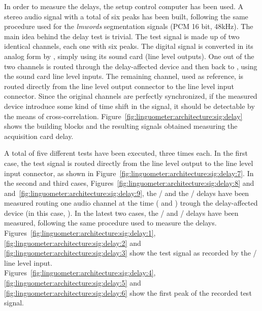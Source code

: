 In order to measure the delays, the setup control computer  has been 
used.
A stereo audio signal with a total of six peaks has been built, 
following the same procedure used for the \emph{lmwords} segmentation signals
(PCM 16 bit, 48kHz).
The main idea behind the delay test is trivial. The test signal is made up of
two identical channels, each one with six peaks.
The digital signal is converted in its analog form by , simply using
its sound card (line level outputs).
One out of the two channels is routed through the delay-affected device and then
back to , using the sound card line level inputs.
The remaining channel, used as reference, is routed directly
from the line level output connector to the line level input connector.
Since the original channels are perfectly synchronized, if the measured device
introduce some kind of time shift in the signal, it should be detectable by the
means of cross-correlation.
Figure~\ref{fig:linguometer:architecture:sig:delay} shows the building blocks
and the resulting signals obtained measuring the acquisition card delay.

A total of five different tests have been executed, three times each.
In the first case, the test signal is routed directly from the line level output
to the line level input connector, as shown in
Figure~\ref{fig:linguometer:architecture:sig:delay:7}.
In the second and third cases,
Figures~\ref{fig:linguometer:architecture:sig:delay:8} and
and~\ref{fig:linguometer:architecture:sig:delay:9},
the  / and
the / delays have been measured routing one audio channel
at the time ( and ) trough the delay-affected
device (in this case, ).
In the latest two cases, the  / and 
/ delays have been measured, following the same
procedure used to measure the  delays.
Figures~\ref{fig:linguometer:architecture:sig:delay:1}, 
\ref{fig:linguometer:architecture:sig:delay:2} and
\ref{fig:linguometer:architecture:sig:delay:3} show the test signal 
as recorded by the  / line level input.\\
Figures~\ref{fig:linguometer:architecture:sig:delay:4}, 
\ref{fig:linguometer:architecture:sig:delay:5} and
\ref{fig:linguometer:architecture:sig:delay:6} show the
first peak of the recorded test signal.


